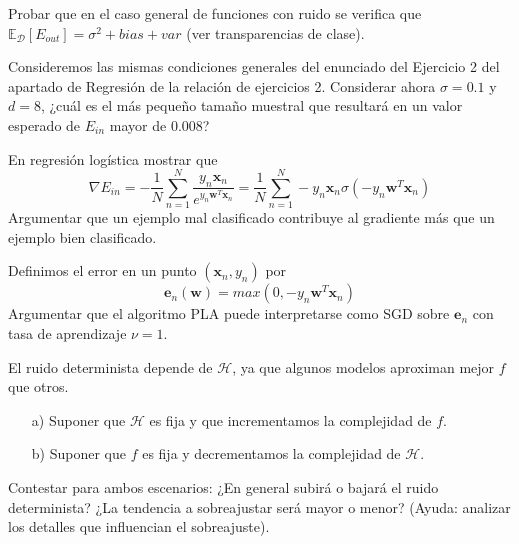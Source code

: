 \documentclass[12pt]{article}
\theoremstyle{definition}
\begin{document}
\begin{pregunta}
Probar que en el caso general de funciones con ruido se verifica que $\mathbb{E}_{\mathcal{D}}[E_{out}]=\sigma^2+bias+var$ (ver transparencias de clase).\\


\end{pregunta}

\begin{pregunta}
Consideremos las mismas condiciones generales del enunciado del Ejercicio 2 del apartado de Regresión de la relación de ejercicios 2. Considerar ahora $\sigma=0.1$ y $d=8$, ¿cuál es el más pequeño tamaño muestral que resultará en un valor esperado de $E_{in}$ mayor de 0.008?\\


\end{pregunta}

\begin{pregunta}
En regresión logística mostrar que 
\[
	\nabla E_{in} = -\frac{1}{N}\sum_{n=1}^N\frac{y_n\mathbf{x}_n}{e^{y_n\mathbf{w}^T\mathbf{x}_n}} = \frac{1}{N}\sum_{n=1}^N-y_n\mathbf{x}_n\sigma(-y_n\mathbf{w}^T\mathbf{x}_n)
\]
Argumentar que un ejemplo mal clasificado contribuye al gradiente más que un ejemplo bien clasificado.\\


\end{pregunta}

\begin{pregunta}
Definimos el error en un punto $(\mathbf{x}_n,y_n)$ por 
\[		\mathbf{e}_n(\mathbf{w})=max(0,-y_n\mathbf{w}^T\mathbf{x}_n)		\]
Argumentar que el algoritmo PLA puede interpretarse como SGD sobre $\mathbf{e}_n$ con tasa de aprendizaje $\nu=1$.\\


\end{pregunta}

\begin{pregunta}
El ruido determinista depende de $\mathcal{H}$, ya que algunos modelos aproximan mejor $f$ que otros.
\begin{enumerate}
\item[a)] Suponer que $\mathcal{H}$ es fija y que incrementamos la complejidad de $f$.
\item[b)] Suponer que $f$ es fija y decrementamos la complejidad de $\mathcal{H}$.
\end{enumerate}
Contestar para ambos escenarios: ¿En general subirá o bajará el ruido determinista? ¿La tendencia a sobreajustar será mayor o menor? (Ayuda: analizar los detalles que influencian el sobreajuste).\\


\end{pregunta}
\end{document}
